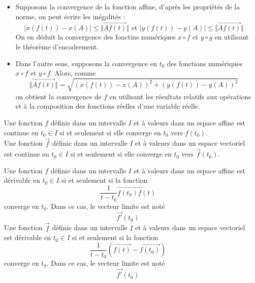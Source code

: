 \begin{description}
\begin{demo}
 \begin{itemize}
 \item Supposons la convergence de la fonction affine, d'après les propriétés de la norme, on peut écrire les inégalités :
\begin{displaymath}
 |x(f(t))-x(A)| \leq  \Vert \overrightarrow{Af(t)}\Vert \text{ et }
 |y(f(t))-y(A)| \leq  \Vert \overrightarrow{Af(t)}\Vert
\end{displaymath}
On en déduit la convergence des fonctins numériques $x\circ f$ et $y\circ g$ en utilisant le théorème d'encadrement.
\item Dans l'autre sens, supposons la convergence en $t_0$ des fonctions numériques $x\circ f$ et $y\circ f$. Alors, comme
\begin{displaymath}
 \Vert \overrightarrow{Af(t)}\Vert = \sqrt{(x(f(t))-x(A))^2 + (y(f(t))-y(A))^2}
\end{displaymath}
on obtient la convergence de $f$ en utilisant les résultats relatifs aux opérations et à la composition des fonctions réelles d'une variable réelle.
\end{itemize}
\end{demo}
\begin{defi}[Continuité]
 Une fonction $f$ définie dans un intervalle $I$ et à valeurs dans un espace affine est continue en $t_0\in I$ si et seulement si elle converge en $t_0$ vers $f(t_0)$.\\
Une fonction $\overrightarrow f$ définie dans un intervalle $I$ et à valeurs dans un espace vectoriel est continue en $t_0\in I$ si et seulement si elle converge en $t_0$ vers $\overrightarrow f(t_0)$.
\end{defi}
\begin{defi}[Dérivabilité]
 Une fonction $f$ définie dans un intervalle $I$ et à valeurs dans un espace affine est dérivable en $t_0\in I$ si et seulement si la fonction
\begin{displaymath}
 \dfrac{1}{t-t_0}\overrightarrow{f(t_0) f(t)}
\end{displaymath}
converge en $t_0$. Dans ce cas, le vecteur limite est noté
\begin{displaymath}
 \overrightarrow{f'}(t_0)
\end{displaymath}
 Une fonction $\overrightarrow f$ définie dans un intervalle $I$ et à valeurs dans un espace vectoriel est dérivable en $t_0\in I$ si et seulement si la fonction
\begin{displaymath}
 \dfrac{1}{t-t_0}\left(\overrightarrow{f(t)}-\overrightarrow{f(t_0)} \right) 
\end{displaymath}
converge en $t_0$. Dans ce cas, le vecteur limite est noté
\begin{displaymath}
 \overrightarrow{f'}(t_0)
\end{displaymath}
\end{defi}


\end{description}
